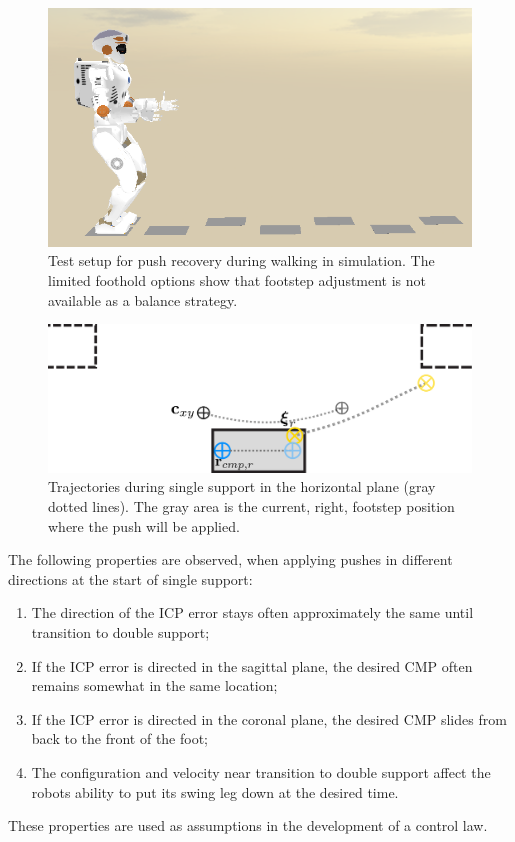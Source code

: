 \begin{figure}[h]
\centering
  \includegraphics[width=.8\linewidth]{STYLESTUFF/valwalkingtest.png}
   \caption{Test setup for push recovery during walking in simulation. The limited foothold options show that footstep adjustment is not available as a balance strategy.}
    \label{fig:valwalkingtest}
\end{figure}
\begin{figure}[h]
\centering
  \includegraphics[width=.8\linewidth]{STYLESTUFF/ICPplan3StepComICPrSS.png}
   \caption{Trajectories during single support in the horizontal plane (gray dotted lines). The gray area is the current, right, footstep position where the push will be applied.}
    \label{fig:3foot}
\end{figure}

The following properties are observed, when applying pushes in different directions at the start of single support:
\begin{enumerate}
	\item The direction of the \ac{ICP} error stays often approximately the same until transition to double support;
	\item If the \ac{ICP} error is directed in the sagittal plane, the desired \ac{CMP} often remains somewhat in the same location;
	\item If the \ac{ICP} error is directed  in the coronal plane, the desired \ac{CMP} slides from back to the front of the foot;
	\item The configuration and velocity near transition to double support affect the robots ability to put its swing leg down at the desired time. 
\end{enumerate}
These properties are used as assumptions in the development of a control law.
